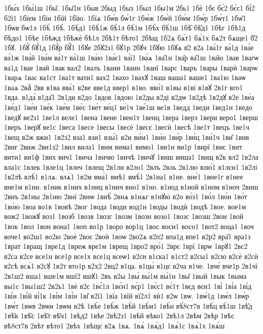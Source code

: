 {1бы́х
1бы́1ш
1бы̑.
1бы̑1н
1быв
2быд
1быз
1был
1бы1м
2бь1
1бѐ
1бє
бє́2
бє́с1
бі́2
б2ї1
1бїем
1бїи
1бїй
1бїю.
1бїѧ
1бѡ́в
бѡ́1г
1бѡ́ж
1бѡ́й
1бѡ́м
1бѡ́р
1бѡ́т1
1бѡ̑1
1бѡв
бѡ1л
1бѣ̀
1бѣ́.
1бѣ́д1
1бѣ́1ж
бѣ́1л
бѣ́1м
1бѣ́х
бѣ́1ш
1бѣ̑
бѣ̑д1
1бѣг
1бѣ1д
бѣдо1
1бѣе
1бѣжд
1бѣжѐ
бѣ1л
2бѣ1т
бѣто1
2бѣщ
1б2ѧ
бѧ́т1
бѧ́1х
бѧ2т
бѧще1
б҃2
1бꙋ.
1бꙋ̀
бꙋ́1д
1бꙋ́р
бꙋ̑1
1бꙋе
2бꙋ2з1
бꙋ1р
2бꙋч
1бꙋю
1бꙋѧ
в̾2
в2а
1ва́1г
ва́1д
1ва́е
ва́1ж
1ва́й
1ва́м
ва́1т
ва́1ш
1ва́ю
1ва́є1
ва́ї1
1ва́ѧ
1ва̑1н
1ва̑р
ва̑1ш
1ва̑ю
1вав
1вагѡ
ва1д
1вае
1вай
1вак
вал2
1валъ
1вани
1ванн
1ванї
1варс
1варъ
1вары
1варѝ
1варѡ
1варѧ
1вас
ва1ст
1ва1т
вати1
вах2
1вахо
1вахꙋ
1ваш
ваша1
ваше1
1ва1ю
1ваѡ
1ваѧ
2ваⷤ
2вв
в1ва
вва́1
в2ве
вве1д
ввер1
в1во.
вво́1
в1вы
в1ві
в1вꙋ
2в1г
вго1
1вда.
в1да́
в1да̑1
2в1ди
в2до
1вдов
1вдою
1в2ды
в2ді
в2дѡ
1в2дѣ
1в2дꙋ
в2е
1ве́а
1ве́д1
1ве́и
1ве́к
1ве́м
1ве́с
1ве́т
ве́ц1
ве́1ч
1ве́1ш
ве1в
1ведд
1веди
1вед1н
1ведо
1ведꙋ
ве2з1
1ве1л
веле1
1вена
1вене
1вен1т
1венц
1вера
1верз
1вери
веро1
1верш
1веръ
1верꙋ
ве1с
1веса
1весе
1весы
1весѐ
1весє
1весѝ
1весѣ
1ве1т
1вецъ
1ве1ч
1вещ
в2ж
вжи1
1в2з2
вза1
взи1
взы́1
в2и
ви́м1
1ви́н
1ви́р
1ви́ц
1ви́1ч
1ви̑
1вив
2виг
2виж
2ви1з2
1вил
вила1
1вим
вима1
вимо1
1ви1н
ви1р
1вирї
1вис
1вит
вити1
ви1ф
1вих
вич1
1вича
1вичю
1вичѣ
1вичꙋ
1виш
виша1
1вищ
в2к
вл2
1в2ла
вла1с
1влек
1вле1ц
1влеч
1влещ
2в1ли
в2ло1
2влъ
2вль
2в1лю
влю́1
в1лєн1
1в2лі
1в2лѣ
влѣ́1
в1лѧ.
влѧ́1
1в2м
вма́1
вмѣ1
вмѣ́1
2в1на1
в1не.
вне́1
1вне1г
в1нее
вне1м
в1ни.
в1ник
в1них
в1ниц
в1нич
вно1
в1но.
в1нод
в1ной
в1ном
в1ноч
2внш
2внъ
2в1ны
2в1ню
2внї
2внѡ
1внѣ̀
2внѧ
в1нѧг
в1нꙋю
в2о
во́з1
1во́л
1во́н
1во́т
1во́ю
1воа
во1в
1вовѣ
2вог
1вода
1води
вод1н
1воды
1водѝ
1водѣ
1вое.
вое1м
вож2
1вожꙋ
воз1
1возб
1возв
1возг
1возм
1возн
возо1
1возс
1возш
2вои
1вой
1вок
1вол
1вон
вона1
1воп
во1р
1воро
вор1ц
1вос
воси1
восо1
1вот2
воца1
1воч
воче1
во2ш1
во2ю
2воѐ
2воє
2воѝ
1воѡ
2во2ѧ
в2п2
впа1д
впе1
в2р2
вра̑1
вра1з
1врат
1вращ
1вре1д
1вреж
вре1м
1врещ
1вро2
вро́1
2врє
1врї
1врѡ
1врꙋ1
2вс2
в2са
в2се
все1н
все1р
все1х
все1ц
всеѡ1
в2си
в1ска1
в1ст2
в2сы1
в2сю
в2сѐ
в2сѝ
в2сѣ
всѧ́1
в2сꙋ
1в2т
вто1р
в2х2
2вц2
в1ца.
в1цы̀
в1цє
в2ча
в1че.
1вче́
вче1р
2в1чї
2в1ш2
вша1
вше1м
вшї2
вшꙋ1
2въ
в2ы
1вы́
вы́1м
вы́1н
1вы̑
1вый
1вык
1выма
вы1с
1вы1ш2
2в2ь1
1вѐ
в2є
1вє́1л
1вє́н1
вє́р1
1вє́с1
вє́1т
1вєд
вєн1
1ві̀
1ві́а
1ві́д
1ві́и
1ві́й
ві́1к
1ві́м
1ві́н
1ві̑
в2ї1
1вїа
1вїй
вї2л1
вѝ1
в2ѡ
1вѡ.
1вѡ́1д
1вѡ́л
1вѡ́р
1вѡ́т
1вѡв
2вѡи
1вѡм
в2ѣ
1вѣ́е
1вѣ́ж
1вѣ́й
1вѣ́м1
1вѣ́н
вѣ́8ст7в
1вѣ́ц
вѣ́1ш
1вѣ̑д
1вѣ̑к
1вѣ̑с
1вѣ̑т
вѣ̑ч1
1вѣд2
1вѣе
2вѣ2з1
1вѣй
вѣко1
2вѣ1л
2вѣм
2вѣр
1вѣс
вѣ8ст7в
2вѣт
вѣто1
2вѣх
1вѣщє
в2ѧ
1вѧ.
1вѧ̀
1вѧ́д1
1вѧ́1с
1вѧ́1х
1вѧ́ш
}
